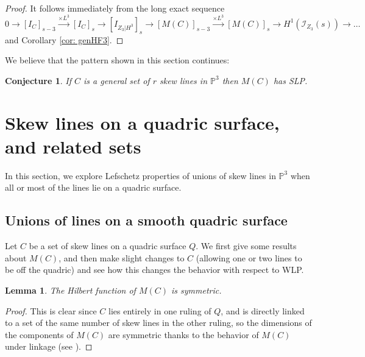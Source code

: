 \documentclass[12pt]{amsart}%
\numberwithin{equation}{section}
\newtheorem{lemma}[theorem]{Lemma}
\newtheorem{conjecture}[theorem]{Conjecture}
\theoremstyle{definition}
\numberwithin{equation}{section}
\newcommand{\PP}{ \ensuremath{\mathbb{P}}}
\begin{document}
\begin{proof}
  It follows immediately from the long exact sequence
  \[
  0 \rightarrow [I_C]_{s-3} \stackrel{\times L^3}{\longrightarrow} [I_C]_s \rightarrow [I_{Z_3 | H^3}]_s \rightarrow [M(C)]_{s-3} \stackrel{\times L^3}{\longrightarrow} [M(C)]_s \rightarrow H^1(\mathcal I_{Z_3} (s)) \rightarrow \dots
  \]
  and Corollary \ref{cor: genHF3}.
\end{proof}


We believe that the pattern shown in this section continues:

\begin{conjecture}
    If $C$ is a general set of $r$ skew lines in $\mathbb P^3$ then $M(C)$ has SLP.
\end{conjecture}







\section{Skew lines on a quadric surface, and related sets}
\label{sec4}

In this section, we explore Lefschetz properties of unions of skew lines in $\PP^3$ when all or most of the lines lie on a quadric surface.

\subsection{Unions of lines on a smooth quadric surface}

Let $C$ be a set of skew lines on a quadric surface $Q$. We first give some results about $M(C)$, and then make slight changes to $C$ (allowing one or two lines to be off the quadric) and see how this changes the behavior with respect to WLP.

\begin{lemma} 
The Hilbert function of $M(C)$ is symmetric.
\end{lemma}

\begin{proof}
    This is clear since $C$ lies entirely in one ruling of $Q$, and is directly linked to a set of the same number of skew lines in the other ruling, so the dimensions of the components of $M(C)$ are symmetric thanks to the behavior of $M(C)$ under linkage (see \cite{MBook}).
\end{proof}
\end{document}
